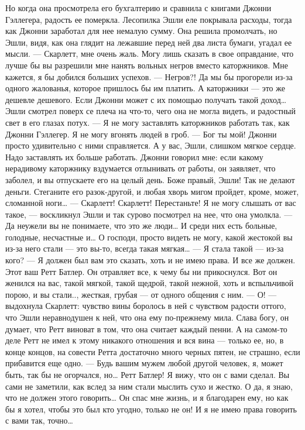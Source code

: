 Но когда она просмотрела его бухгалтерию и сравнила с книгами Джонни Гэллегера, радость ее померкла. Лесопилка Эшли еле покрывала расходы, тогда как Джонни заработал для нее немалую сумму. Она решила промолчать, но Эшли, видя, как она глядит на лежавшие перед ней два листа бумаги, угадал ее мысли.
— Скарлетт, мне очень жаль. Могу лишь сказать в свое оправдание, что лучше бы вы разрешили мне нанять вольных негров вместо каторжников. Мне кажется, я бы добился больших успехов. — Негров?! Да мы бы прогорели из-за одного жалованья, которое пришлось бы им платить. А каторжники — это же дешевле дешевого. Если Джонни может с их помощью получать такой доход…
Эшли смотрел поверх се плеча на что-то, чего она не могла видеть, и радостный свет в его глазах потух.
— Я не могу заставлять каторжников работать так, как Джонни Гэллегер. Я не могу вгонять людей в гроб.
— Бог ты мой! Джонни просто удивительно с ними справляется. А у вас, Эшли, слишком мягкое сердце. Надо заставлять их больше работать. Джонни говорил мне: если какому нерадивому каторжнику вздумается отлынивать от работы, он заявляет, что заболел, и вы отпускаете его на целый день. Боже правый, Эшли! Так не делают деньги. Стеганите его разок-другой, и любая хворь мигом пройдет, кроме, может, сломанной ноги…
— Скарлетт! Скарлетт! Перестаньте! Я не могу слышать от вас такое, — воскликнул Эшли и так сурово посмотрел на нее, что она умолкла. — Да неужели вы не понимаете, что это же люди… И среди них есть больные, голодные, несчастные и… О господи, просто видеть не могу, какой жестокой вы из-за него стали — это вы-то, всегда такая мягкая…
— Я стала такой — из-за кого?
— Я должен был вам это сказать, хоть и не имею права. И все же должен. Этот ваш Ретт Батлер. Он отравляет все, к чему бы ни прикоснулся. Вот он женился на вас, такой мягкой, такой щедрой, такой нежной, хоть и вспыльчивой порою, и вы стали.., жесткая, грубая — от одного общения с ним.
— О! — выдохнула Скарлетт: чувство вины боролось в ней с чувством радости оттого, что Эшли неравнодушен к ней, что она ему по-прежнему мила. Слава богу, он думает, что Ретт виноват в том, что она считает каждый пенни. А на самом-то деле Ретт не имел к этому никакого отношения и вся вина — только ее, но, в конце концов, на совести Ретта достаточно много черных пятен, не страшно, если прибавится еще одно.
— Будь вашим мужем любой другой человек, я, может быть, так бы не огорчался, но… Ретт Батлер! Я вижу, что он с вами сделал. Вы сами не заметили, как вслед за ним стали мыслить сухо и жестко. О да, я знаю, что не должен этого говорить… Он спас мне жизнь, и я благодарен ему, но как бы я хотел, чтобы это был кто угодно, только не он! И я не имею права говорить с вами так, точно…
